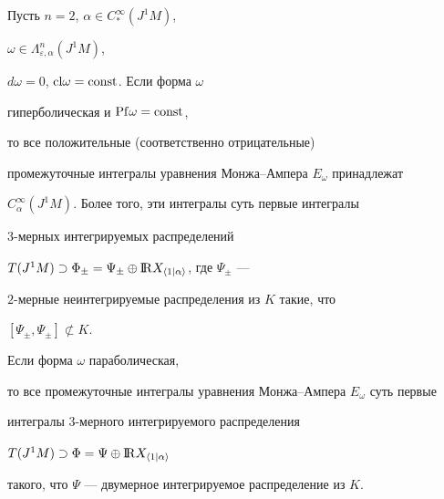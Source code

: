 \begin{prop}\label{integral2}


Пусть $n=2$, $\alpha \in C_{*}^\infty (J^1M)$,


$\omega \in\Lambda_{\varepsilon ,\alpha }^n(J^1M)$,


$d\omega =0$, ${\operatorname{cl}}\omega ={\operatorname{const}}$. Если форма $\omega$


гиперболическая и ${\operatorname{Pf}}\omega ={\operatorname{const}}$,


то все положительные (соответственно отрицательные)


промежуточные интегралы уравнения Монжа--Ампера $E_\omega$ принадлежат


$C_\alpha^\infty (J^1M)$. Более того, эти интегралы суть первые интегралы 


$3$-мерных интегрируемых распределений


$T(J^1M)\supset\Phi_{\pm}=


\Psi_{\pm}\oplus{\BBR}X_{\langle 1\mid\alpha\rangle}$, где $\Psi_{\pm}$ ---


$2$-мерные неинтегрируемые распределения из $K$ такие, что 


$[\Psi_{\pm },\Psi_{\pm }]\not\subset K$.


Если форма $\omega$ параболическая,


то все промежуточные интегралы уравнения Монжа--Ампера $E_\omega$ суть первые 


интегралы $3$-мерного интегрируемого распределения


$T(J^1M)\supset\Phi=\Psi\oplus{\mathrm{I\!R}}X_{\langle 1\mid \alpha\rangle}$


такого, что $\Psi$ --- двумерное интегрируемое распределение из $K$.


\end{prop}





